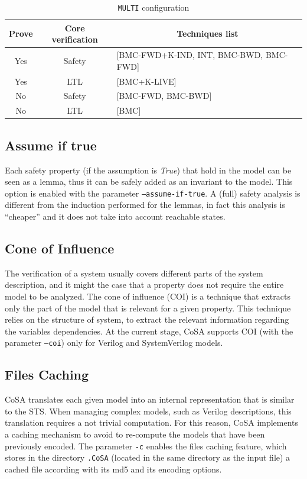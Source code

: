 \documentclass{article}
\theoremstyle{definition}
\begin{document}
\begin{table}[h]
  \centering
\begin{tabular}{ c c | l }
  Prove & Core verification & \multicolumn{1}{|c}{Techniques list} \\ \hline
  Yes & Safety & [BMC-FWD+K-IND, INT, BMC-BWD, BMC-FWD]  \\
  Yes & LTL & [BMC+K-LIVE]  \\
  No & Safety & [BMC-FWD, BMC-BWD]  \\
  No & LTL & [BMC]  \\
\end{tabular}
\caption{\texttt{MULTI} configuration}
\label{tab:multi_conf}
\end{table}


\subsection{Assume if true}
Each safety property (if the assumption is \emph{True}) that hold in
the model can be seen as a lemma, thus it can be safely added as an
invariant to the model. This option is enabled with the parameter
\texttt{--assume-if-true}. A (full) safety analysis is different from
the induction performed for the lemmas, in fact this analysis is
``cheaper'' and it does not take into account reachable states.

\subsection{Cone of Influence}
The verification of a system usually covers different parts of the
system description, and it might the case that a property does not
require the entire model to be analyzed. The cone of influence (COI)
is a technique that extracts only the part of the model that is
relevant for a given property. This technique relies on the structure
of system, to extract the relevant information regarding the variables
dependencies. At the current stage, CoSA supports COI (with the
parameter \texttt{--coi}) only for Verilog and SystemVerilog models.

\subsection{Files Caching}
CoSA translates each given model into an internal representation that
is similar to the STS. When managing complex models, such as Verilog
descriptions, this translation requires a not trivial computation. For
this reason, CoSA implements a caching mechanism to avoid to
re-compute the models that have been previously encoded. The parameter
\texttt{-c} enables the files caching feature, which stores in the
directory \texttt{.CoSA} (located in the same directory as the input
file) a cached file according with its md5 and its encoding options.
\end{document}
